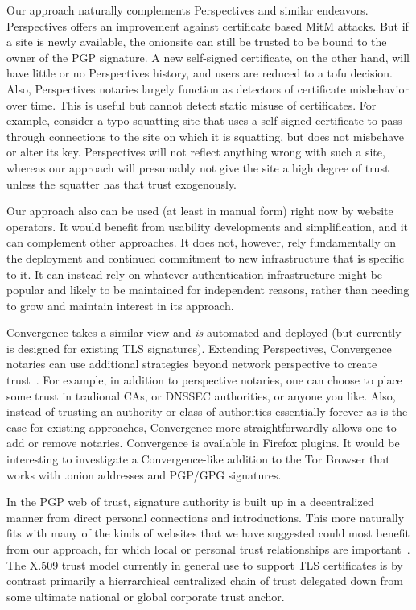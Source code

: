 \documentclass[10pt, conference, compsocconf]{styles/IEEEtran}
\begin{document}
Our approach naturally complements Perspectives and similar
endeavors. Perspectives offers an improvement against
certificate based MitM attacks. But if a site is newly available,
the onionsite can still be trusted to be bound to the owner of
the PGP signature. A new self-signed certificate, on the other hand,
will have little or no
Perspectives history, and users are reduced to a tofu
decision. Also, Perspectives notaries largely function as
detectors of certificate misbehavior over time. This is useful
but cannot detect static misuse of certificates.
For example, consider a typo-squatting site that uses a self-signed
certificate to pass through connections to the site on which it is
squatting, but
does not misbehave or alter its key. Perspectives will not reflect
anything wrong with such a site, whereas our approach will presumably
not give the site a high degree of trust unless the squatter has
that trust exogenously. 

Our approach also can be used (at least in manual form) right now by
website operators. It would benefit from usability developments
and simplification, and it can complement other approaches. It does not,
however,
rely fundamentally on the deployment and continued commitment to new
infrastructure that is specific to it.  It can instead
rely on whatever authentication infrastructure might be popular
and likely to be maintained for independent reasons, rather than
needing to grow and maintain interest in its approach.

Convergence takes a similar view and \emph{is} automated and deployed
(but currently is designed for existing TLS signatures).  Extending
Perspectives, Convergence notaries can use additional strategies
beyond network perspective to create trust~\cite{convergence}. For
example, in addition to perspective notaries, one can choose to place
some trust in tradional CAs, or DNSSEC authorities, or anyone you
like. Also, instead of trusting an authority or class of authorities
essentially forever as is the case for existing approaches,
Convergence more straightforwardly allows one to add or remove
notaries. Convergence is available in Firefox plugins. It would be
interesting to investigate a Convergence-like addition to the Tor
Browser that works with .onion addresses and PGP/GPG signatures.

In the PGP web of trust, signature authority is built up in a
decentralized manner from direct personal connections and
introductions. This more naturally fits with many of the kinds of
websites that we have suggested could most benefit from our approach,
for which local or personal trust relationships are
important~\cite{zimmerman}.  The X.509 trust model currently in
general use to support TLS certificates is by contrast primarily a
hierrarchical centralized chain of trust delegated down from some
ultimate national or global corporate trust anchor.
\end{document}

